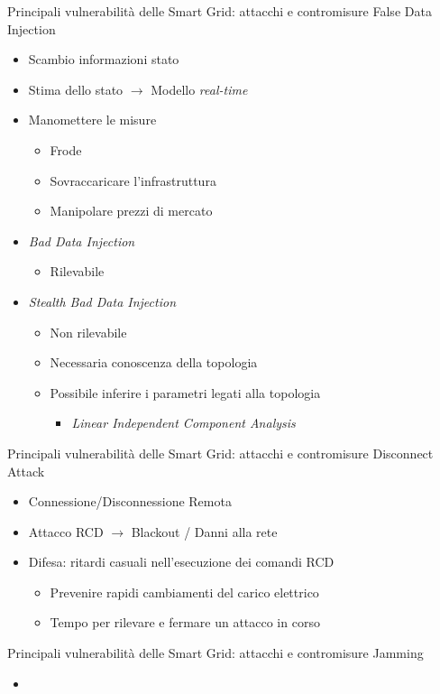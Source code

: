 \begin{frame}{Principali vulnerabilità delle Smart Grid: attacchi e contromisure}
False Data Injection
\begin{itemize}[<+- | alert@+>]
	\item Scambio informazioni stato
	\item Stima dello stato $\rightarrow$ Modello \textit{real-time}
	\item Manomettere le misure
	\begin{itemize}
		\item Frode
		\item Sovraccaricare l'infrastruttura
		\item Manipolare prezzi di mercato
	\end{itemize}
	\item \textit{Bad Data Injection}
	\begin{itemize}
		\item Rilevabile
	\end{itemize}
	\item \textit{Stealth Bad Data Injection}
	\begin{itemize}
		\item Non rilevabile
		\item Necessaria conoscenza della topologia
		\item Possibile inferire i parametri legati alla topologia
		\begin{itemize}
			\item \textit{Linear Independent Component Analysis}
		\end{itemize}
	\end{itemize}
\end{itemize}
\end{frame}

\begin{frame}{Principali vulnerabilità delle Smart Grid: attacchi e contromisure}
	Disconnect Attack
	\begin{itemize}[<+- | alert@+>]
		\item Connessione/Disconnessione Remota
		\item Attacco RCD $\rightarrow$ Blackout / Danni alla rete
		\item Difesa: ritardi casuali nell'esecuzione dei comandi RCD
		\begin{itemize}
			\item Prevenire rapidi cambiamenti del carico elettrico
			\item Tempo per rilevare e fermare un attacco in corso
		\end{itemize}
	\end{itemize}
\end{frame}

\begin{frame}{Principali vulnerabilità delle Smart Grid: attacchi e contromisure}
	Jamming
	\begin{itemize}[<+- | alert@+>]
		\item 
	\end{itemize}
\end{frame}